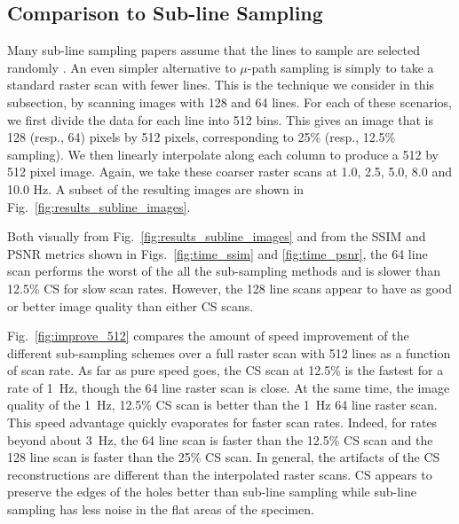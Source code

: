\documentclass[journal]{IEEEtran}
\begin{document}
\subsection{Comparison to Sub-line Sampling} \label{sec:cp_subline}
Many sub-line sampling papers assume that the lines to sample are
selected randomly \cite{han_optimal_2018, Luo_nano_2015}. An even
simpler alternative to $\mu$-path sampling is simply to take a
standard raster scan with fewer lines. This is the technique we
consider in this subsection, by scanning images with 128 and 64 lines.
For each of these scenarios, we first divide the data for each line
into 512 bins. This gives an image that is 128 (resp., 64) pixels by
512 pixels, corresponding to 25\% (resp., 12.5\% sampling). We then linearly interpolate along each column to produce
a 512 by 512 pixel image. Again, we take these coarser raster scans at
1.0, 2.5, 5.0, 8.0 and 10.0 Hz. A subset of the resulting images are shown in
Fig.~\ref{fig:results_subline_images}.

Both visually from Fig.~\ref{fig:results_subline_images} and from the SSIM and PSNR metrics shown in 
Figs.~\ref{fig:time_ssim} and \ref{fig:time_psnr}, the 64 line
scan performs the worst of the all the sub-sampling methods and is
slower than 12.5\% CS for slow scan rates. However, the 128 line scans
appear to have as good or better image quality than either CS scans.


Fig.~\ref{fig:improve_512} compares the amount of speed improvement of
the different sub-sampling schemes over a full raster scan with 512
lines as a function of scan rate. As far as pure speed goes, the CS
scan at 12.5\% is the fastest for a rate of 1~Hz, though the 64 line
raster scan is close. At the same time, the image quality of the 1~Hz,
12.5\% CS scan is better than the 1~Hz 64 line raster scan.
This speed advantage quickly evaporates for faster scan rates.
Indeed, for rates beyond about 3~Hz, the 64 line scan is faster than the 12.5\% CS scan and
the 128 line scan is faster than the 25\% CS scan. 
In general, the artifacts of the CS reconstructions are different than the interpolated raster scans.
CS appears to preserve the edges of the holes better than sub-line sampling while sub-line sampling has less noise in the flat areas of the specimen. 
\end{document}
